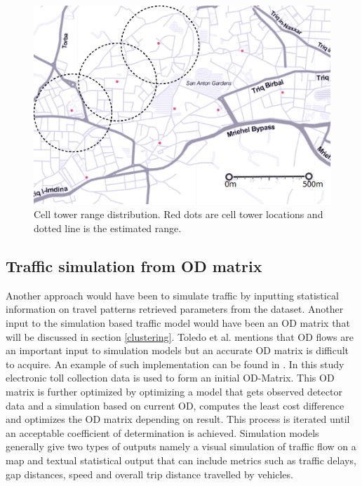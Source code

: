 \documentclass[12pt, a4paper]{report}
\theoremstyle{definition}
\theoremstyle{definition}%
\theoremstyle{definition}%
\theoremstyle{definition}%
\theoremstyle{definition}%
\theoremstyle{definition}%
\begin{document}
\begin{figure}[h]	
	\includegraphics[scale=0.75]{cell_towers_distribution}
	\centering
	\caption{Cell tower range distribution. Red dots are cell tower locations and dotted line is the estimated range.}
	\label{fig:cell_towers_distribution}
\end{figure}

\subsection{Traffic simulation from OD matrix} \label{subsection:methodology:traffic_simulation_ODMatrix}
Another approach would have been to simulate traffic by inputting statistical information on travel patterns retrieved parameters from the dataset. Another input to the simulation based traffic model would have been an OD matrix that will be discussed in section \ref{clustering}. Toledo et al. \cite{Toledo2004} mentions that OD flows are an important input to simulation models but an accurate OD matrix is difficult to acquire. An example of such implementation can be found in \cite{Hirai2015}. In this study electronic toll collection data is used to form an initial OD-Matrix. This OD matrix is further optimized by optimizing a model that gets observed detector data and a simulation based on current OD, computes the least cost difference and optimizes the OD matrix depending on result. This process is iterated until an acceptable coefficient of determination is achieved. Simulation models generally give two types of outputs namely a visual simulation of traffic flow on a map and textual statistical output that can include metrics such as traffic delays, gap distances, speed and overall trip distance travelled by vehicles.
\end{document}

